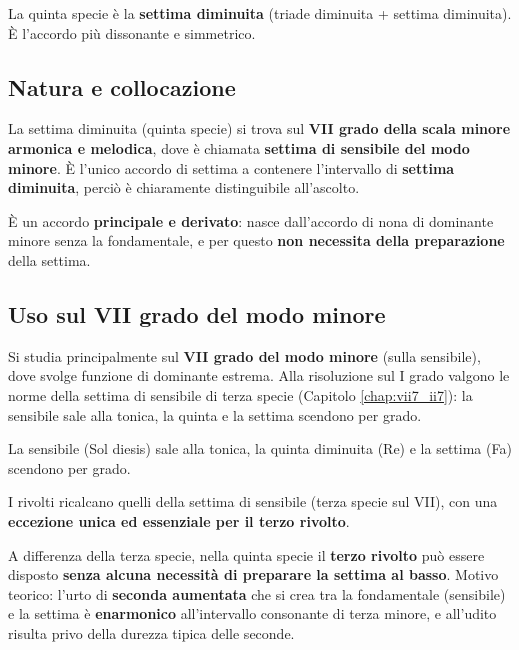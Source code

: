 La quinta specie è la \textbf{settima diminuita} (triade diminuita + settima diminuita). È l'accordo più dissonante e simmetrico.

\subsection{Natura e collocazione}
\label{subsec:vii_dim7_natura}

\begin{regola}
	\label{reg:vii_dim7_gradi}
	La settima diminuita (quinta specie) si trova sul \textbf{VII grado della scala minore armonica e melodica}, dove è chiamata \textbf{settima di sensibile del modo minore}. È l'unico accordo di settima a contenere l'intervallo di \textbf{settima diminuita}, perciò è chiaramente distinguibile all'ascolto.
\end{regola}

È un accordo \textbf{principale e derivato}: nasce dall'accordo di nona di dominante minore senza la fondamentale, e per questo \textbf{non necessita della preparazione} della settima.

\subsection{Uso sul VII grado del modo minore}
Si studia principalmente sul \textbf{VII grado del modo minore} (sulla sensibile), dove svolge funzione di dominante estrema. Alla risoluzione sul I grado valgono le norme della settima di sensibile di terza specie (Capitolo \ref{chap:vii7_ii7}): la sensibile sale alla tonica, la quinta e la settima scendono per grado.

\begin{esempio}
	\label{ex:vii_dim7}
	La sensibile (Sol diesis) sale alla tonica, la quinta diminuita (Re) e la settima (Fa) scendono per grado.
\end{esempio}

I rivolti ricalcano quelli della settima di sensibile (terza specie sul VII), con una \textbf{eccezione unica ed essenziale per il terzo rivolto}.

\begin{osservazione}
	\label{oss:dim7_terzo_rivolto}
	A differenza della terza specie, nella quinta specie il \textbf{terzo rivolto} può essere disposto \textbf{senza alcuna necessità di preparare la settima al basso}. Motivo teorico: l'urto di \textbf{seconda aumentata} che si crea tra la fondamentale (sensibile) e la settima è \textbf{enarmonico} all'intervallo consonante di terza minore, e all'udito risulta privo della durezza tipica delle seconde.
\end{osservazione}

